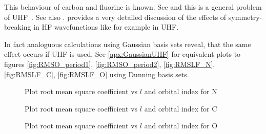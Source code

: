 This behaviour of carbon and fluorine is known.
See \citet{Cook1981}
and this is a general problem of UHF~\citet{Cook1984}.
See also \citet{McWeeny1985}.
\citet{Fukutome1981} provides a very detailed discussion of the
effects of symmetry-breaking in HF wavefunctions like for example in UHF.
%

In fact analoguous calculations using Gaussian basis sets reveal,
that the same effect occurs if UHF is used.
See \vref{apx:GaussianUHF} for equivalent plots to figures \vref{fig:RMSO_period1},
\vref{fig:RMSO_period2},  \vref{fig:RMSLF_N}, \vref{fig:RMSLF_C}, \vref{fig:RMSLF_O}
using Dunning basis sets.





\begin{figure}
	\centering
	\caption{Plot root mean square coefficient vs $l$ and orbital index for N}
	\label{fig:RMSLF_N}
\end{figure}

\begin{figure}
	\centering
	\caption{Plot root mean square coefficient vs $l$ and orbital index for C}
	\label{fig:RMSLF_C}
\end{figure}

\begin{figure}
	\centering
	\caption{Plot root mean square coefficient vs $l$ and orbital index for O}
	\label{fig:RMSLF_O}
\end{figure}

